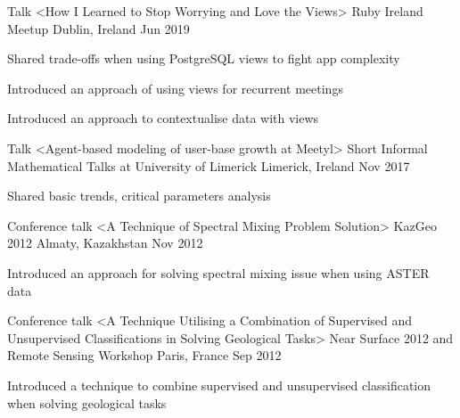 

\begin{cventries}

  \cventry
    {Talk <How I Learned to Stop Worrying and Love the Views>} %
    {Ruby Ireland Meetup} %
    {Dublin, Ireland} %
    {Jun 2019} %
    {
      \begin{cvitems} %
        \item {Shared trade-offs when using PostgreSQL views to fight app complexity}
        \item {Introduced an approach of using views for recurrent meetings}
        \item {Introduced an approach to contextualise data with views}
      \end{cvitems}
    }

  \cventry
    {Talk <Agent-based modeling of user-base growth at Meetyl>} %
    {Short Informal Mathematical Talks at University of Limerick} %
    {Limerick, Ireland} %
    {Nov 2017} %
    {
      \begin{cvitems} %
        \item {Shared basic trends, critical parameters analysis}
      \end{cvitems}
    }

  \cventry
    {Conference talk <A Technique of Spectral Mixing Problem Solution>} %
    {KazGeo 2012} %
    {Almaty, Kazakhstan} %
    {Nov 2012} %
    {
      \begin{cvitems} %
        \item {Introduced an approach for solving spectral mixing issue when using ASTER data}
      \end{cvitems}
    }

  \cventry
    {Conference talk <A Technique Utilising a Combination of Supervised and Unsupervised Classifications in Solving Geological Tasks>} %
    {Near Surface 2012 and Remote Sensing Workshop} %
    {Paris, France} %
    {Sep 2012} %
    {
      \begin{cvitems} %
        \item {Introduced a technique to combine supervised and unsupervised classification when solving geological tasks}
      \end{cvitems}
    }

\end{cventries}
